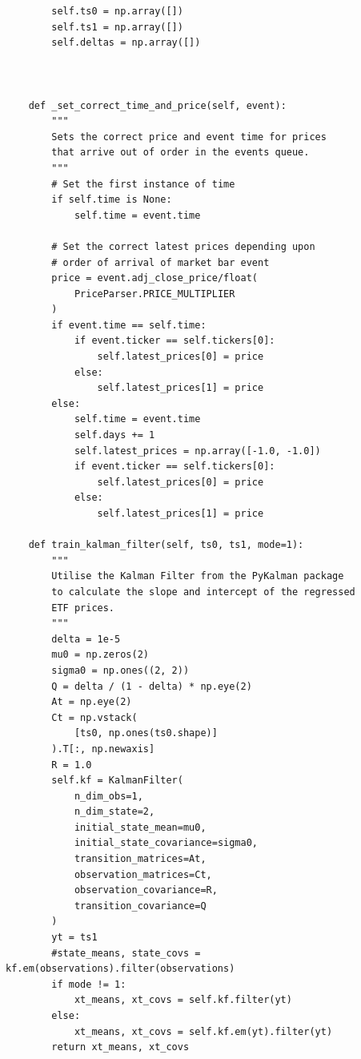 \documentclass{article}
\begin{document}
\begin{lstlisting}
        self.ts0 = np.array([])
        self.ts1 = np.array([])
        self.deltas = np.array([])
        
        

    def _set_correct_time_and_price(self, event):
        """
        Sets the correct price and event time for prices
        that arrive out of order in the events queue.
        """
        # Set the first instance of time
        if self.time is None:
            self.time = event.time
        
        # Set the correct latest prices depending upon 
        # order of arrival of market bar event
        price = event.adj_close_price/float(
            PriceParser.PRICE_MULTIPLIER
        )
        if event.time == self.time:
            if event.ticker == self.tickers[0]:
                self.latest_prices[0] = price
            else:
                self.latest_prices[1] = price
        else:
            self.time = event.time
            self.days += 1
            self.latest_prices = np.array([-1.0, -1.0])
            if event.ticker == self.tickers[0]:
                self.latest_prices[0] = price
            else:
                self.latest_prices[1] = price

    def train_kalman_filter(self, ts0, ts1, mode=1):
        """
        Utilise the Kalman Filter from the PyKalman package
        to calculate the slope and intercept of the regressed
        ETF prices.
        """
        delta = 1e-5
        mu0 = np.zeros(2)
        sigma0 = np.ones((2, 2))
        Q = delta / (1 - delta) * np.eye(2)
        At = np.eye(2)
        Ct = np.vstack(
            [ts0, np.ones(ts0.shape)]
        ).T[:, np.newaxis]
        R = 1.0
        self.kf = KalmanFilter(
            n_dim_obs=1,
            n_dim_state=2,
            initial_state_mean=mu0,
            initial_state_covariance=sigma0,
            transition_matrices=At,
            observation_matrices=Ct,
            observation_covariance=R,
            transition_covariance=Q
        )
        yt = ts1
        #state_means, state_covs = kf.em(observations).filter(observations)
        if mode != 1:
            xt_means, xt_covs = self.kf.filter(yt)
        else:
            xt_means, xt_covs = self.kf.em(yt).filter(yt)
        return xt_means, xt_covs



\end{lstlisting}
\end{document}
